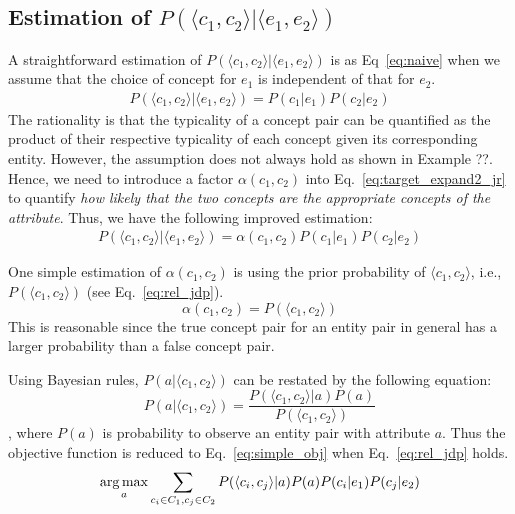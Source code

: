 \subsection{Estimation of $P(\langle c_1,c_2\rangle | \langle e_1,e_2\rangle)$ }
A straightforward estimation of $P( \langle c_{1},c_{2} \rangle | \langle e_{1},e_{2} \rangle )$ is as Eq~\ref{eq:naive} when we assume that the choice of concept for $e_1$ is independent of that for $e_2$.
\begin{equation}
\label{eq:naive}
\begin{split}
P(\langle c_{1},c_{2}\rangle |\langle e_{1},e_{2} \rangle) = P(c_1|e_1) P(c_2|e_2)
\end{split}
\end{equation} The rationality is that the typicality of a concept pair can be quantified as the product of their respective typicality of each concept given its corresponding entity.
However, the assumption does not always hold as shown in Example ??. Hence, we need to introduce a factor $\alpha(c_1,c_2)$ into Eq.~\ref{eq:target_expand2_jr} to quantify {\it how likely that the two concepts are the appropriate concepts of the attribute}. Thus, we have the following improved estimation:
\begin{equation}
\label{eq:target_expand2_jr}
\begin{split}
P(\langle c_{1},c_{2}\rangle |\langle e_{1},e_{2} \rangle) = \alpha(c_1,c_2)  P(c_1|e_1)  P(c_2|e_2)
\end{split}
\end{equation}


One simple estimation of $\alpha(c_1,c_2)$ is using the prior probability of $\langle c_1, c_2\rangle$, i.e., $P(\langle c_1,c_2\rangle)$ (see Eq.~\ref{eq:rel_jdp}). 
\begin{equation}\label{eq:rel_jdp}
  \alpha(c_1,c_2) = P(\langle c_1, c_2\rangle)
\end{equation}
This is reasonable since the true concept pair for an entity pair in general has a larger probability than 
a false concept pair. 

Using Bayesian rules, $P(a| \langle c_{1},c_{2} \rangle )$ can be restated by the following equation:
\begin{equation}
\label{eq:target_expand1}
P(a|\langle c_{1},c_{2} \rangle)= \frac{ P(\langle c_{1},c_{2}\rangle|a)P(a) }{ P(\langle c_{1},c_{2}\rangle) }
\end{equation},
where $P(a)$ is probability to observe an entity pair with attribute $a$.
Thus the objective function is reduced to Eq.~\ref{eq:simple_obj} when Eq.~\ref{eq:rel_jdp} holds.
\begin{equation}
\label{eq:simple_obj}
 \operatorname*{arg\,max}_a \sum_{c_i\in C_1, c_j\in C_2} P(\langle c_{i},c_{j}\rangle |a) P(a) P(c_i|e_1) P(c_j|e_2)
\end{equation}




